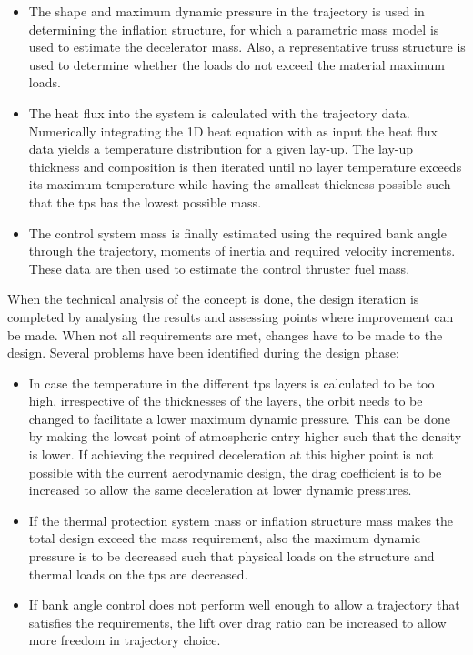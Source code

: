 \begin{itemize}
	\item The shape and maximum dynamic pressure in the trajectory is used in determining the inflation structure, for which a parametric mass model is used to estimate the decelerator mass. Also, a representative truss structure is used to determine whether the loads do not exceed the material maximum loads.
	
	\item The heat flux into the system is calculated with the trajectory data. Numerically integrating the 1D heat equation with as input the heat flux data yields a temperature distribution for a given lay-up. The lay-up  thickness and composition is then iterated until no layer temperature exceeds its maximum temperature while having the smallest thickness possible such that the \gls{tps} has the lowest possible mass.
	
	\item The control system mass is finally estimated using the required bank angle through the trajectory, moments of inertia and required velocity increments. These data are then used to estimate the control thruster fuel mass.
\end{itemize}



When the technical analysis of the concept is done, the design iteration is completed by analysing the results and assessing points where improvement can be made. When not all requirements are met, changes have to be made to the design. Several problems have been identified during the design phase:


\begin{itemize}
	\item In case the temperature in the different \gls{tps} layers is calculated to be too high, irrespective of the thicknesses of the layers, the orbit needs to be changed to facilitate a lower maximum dynamic pressure. This can be done by making the lowest point of atmospheric entry higher such that the density is lower. If achieving the required deceleration at this higher point is not possible with the current aerodynamic design, the drag coefficient is to be increased to allow the same deceleration at lower dynamic pressures.
	
	\item If the thermal protection system mass or inflation structure mass makes the total design exceed the mass requirement, also the maximum dynamic pressure is to be decreased such that physical loads on the structure and thermal loads on the \gls{tps} are decreased.
	
	\item If bank angle control does not perform well enough to allow a trajectory that satisfies the requirements, the lift over drag ratio can be increased to allow more freedom in trajectory choice.
	
	
\end{itemize}



